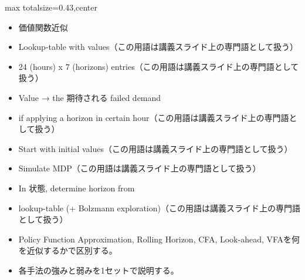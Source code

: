 \clearpage
{}
\begin{minipage}[t]{0.405\textwidth}
\begin{adjustbox}{max totalsize={\textwidth}{0.43\textheight},center}
\begin{minipage}{\textwidth}\scriptsize
{}\begin{itemize}
\item 価値関数近似
\item Lookup-table with values（この用語は講義スライド上の専門語として扱う）
\item 24 (hours) x 7 (horizons) entries（この用語は講義スライド上の専門語として扱う）
\item Value → the 期待される failed demand
\item if applying a horizon in certain hour（この用語は講義スライド上の専門語として扱う）
\item Start with initial values（この用語は講義スライド上の専門語として扱う）
\item Simulate MDP（この用語は講義スライド上の専門語として扱う）
\item In 状態, determine horizon from
\item lookup-table (+ Bolzmann exploration)（この用語は講義スライド上の専門語として扱う）
\end{itemize}\begin{itemize}
\item Policy Function Approximation, Rolling Horizon, CFA, Look-ahead, VFAを何を近似するかで区別する。
\item 各手法の強みと弱みを1セットで説明する。
\end{itemize}
\end{minipage}
\end{adjustbox}
\end{minipage}\hfill
